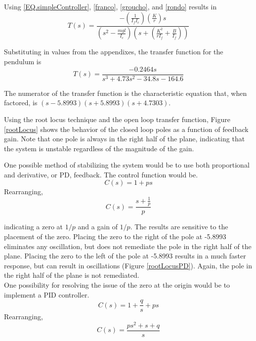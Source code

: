 \documentclass[12pt,letterpaper]{article}
\begin{document}
Using \eqref{EQ.simpleController}, \eqref{franco}, \eqref{groucho}, and \eqref{rondo} results in 
%
\begin{equation}
	T(s) =\frac{-(\frac{1} {I_{f}I_{c}})(\frac{K}{r})s}
	{(s^2-\frac{m g l}{I_{c}})(s+(\frac{K^2}{r I_{f}}+\frac{B}{I_{f}}))}
\end{equation}

Substituting in values from the appendixes, the transfer function for the pendulum is
\begin{equation}
	T(s) =\frac{-0.2464 s}{s^3 + 4.73 s^2 -34.8 s -164.6}
\end{equation}

The numerator of the transfer function is the characteristic equation that, when factored, is
$(s-5.8993) (s+5.8993) (s+4.7303)$.

Using the root locus technique and the open loop transfer function, Figure \ref{rootLocus} shows the
behavior of the closed loop poles as a function of feedback gain.  Note that one pole is always in the right
half of the plane, indicating that the system is unstable regardless of the magnitude of the gain.

One possible method of stabilizing the system would be to use both proportional and derivative, or PD, feedback.  The control function would be.
\begin{equation}
	C(s) = 1 + p s
\end{equation}
Rearranging,
\begin{equation}
	C(s) = \frac{s+\frac{1}{p}}{p}
\end{equation}

indicating a zero at $1/p$ and a gain of $1/p$.
The results are sensitive to the placement of the zero.  Placing the zero to the right of the pole at -5.8993 
eliminates any oscillation, but does not remediate the pole in the right half of the plane.  Placing the zero to the left of the pole at -5.8993 results in a much faster response, but can result in oscillations (Figure \ref{rootLocusPD}).  Again, the pole in the right half of the plane is not remediated. \\


One possibility for resolving the issue of the zero at the origin would be to implement a PID controller.
\begin{equation}
	C(s) = 1 + \frac{q}{s} + p s
\end{equation}
Rearranging,
\begin{equation}
	C(s) = \frac{ps^2+s+q}{s}
\end{equation}
\end{document}
